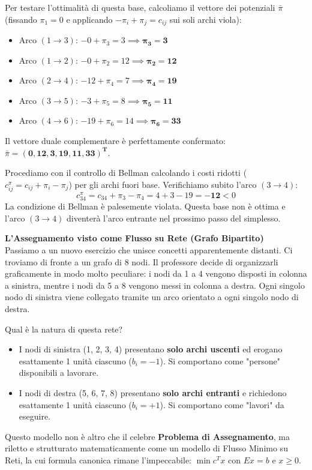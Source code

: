 \documentclass[12pt, a4paper]{article}
\newcommand{\separatore}{\noindent{\color{titlecolor!50}\rule{\textwidth}{0.6pt}}}
\begin{document}
	Per testare l'ottimalità di questa base, calcoliamo il vettore dei potenziali $\bar{\pi}$ (fissando $\pi_1 = 0$ e applicando $-\pi_i + \pi_j = c_{ij}$ sui soli archi viola):
	\begin{itemize}[label=$\circ$, itemsep=2pt, leftmargin=1.5cm]
		\item Arco $(1\to3)$: $-0 + \pi_3 = 3 \implies \mathbf{\pi_3 = 3}$
		\item Arco $(1\to2)$: $-0 + \pi_2 = 12 \implies \mathbf{\pi_2 = 12}$
		\item Arco $(2\to4)$: $-12 + \pi_4 = 7 \implies \mathbf{\pi_4 = 19}$
		\item Arco $(3\to5)$: $-3 + \pi_5 = 8 \implies \mathbf{\pi_5 = 11}$
		\item Arco $(4\to6)$: $-19 + \pi_6 = 14 \implies \mathbf{\pi_6 = 33}$
	\end{itemize}
	Il vettore duale complementare è perfettamente confermato: $\bar{\pi} = \mathbf{(0, 12, 3, 19, 11, 33)^T}$.
	
	Procediamo con il controllo di Bellman calcolando i costi ridotti ($c_{ij}^\pi = c_{ij} + \pi_i - \pi_j$) per gli archi fuori base. Verifichiamo subito l'arco $(3\to4)$:
	\[ c_{34}^\pi = c_{34} + \pi_3 - \pi_4 = 4 + 3 - 19 = \mathbf{-12} < 0 \]
	La condizione di Bellman è palesemente violata. Questa base non è ottima e l'arco $(3\to4)$ diventerà l'arco entrante nel prossimo passo del simplesso.
	
	\vspace{0.6cm}
	\separatore
	\vspace{0.4cm}
	
	\textbf{L'Assegnamento visto come Flusso su Rete (Grafo Bipartito)}\\
	Passiamo a un nuovo esercizio che unisce concetti apparentemente distanti. Ci troviamo di fronte a un grafo di 8 nodi. Il professore decide di organizzarli graficamente in modo molto peculiare: i nodi da 1 a 4 vengono disposti in colonna a sinistra, mentre i nodi da 5 a 8 vengono messi in colonna a destra. 
	Ogni singolo nodo di sinistra viene collegato tramite un arco orientato a ogni singolo nodo di destra.
	
	Qual è la natura di questa rete?
	\begin{itemize}[label=\textcolor{titlecolor}{\Large\textbullet}, itemsep=2pt, leftmargin=1.5cm]
		\item I nodi di sinistra (1, 2, 3, 4) presentano \textbf{solo archi uscenti} ed erogano esattamente 1 unità ciascuno ($b_i = -1$). Si comportano come "persone" disponibili a lavorare.
		\item I nodi di destra (5, 6, 7, 8) presentano \textbf{solo archi entranti} e richiedono esattamente 1 unità ciascuno ($b_i = +1$). Si comportano come "lavori" da eseguire.
	\end{itemize}
	Questo modello non è altro che il celebre \textbf{Problema di Assegnamento}, ma riletto e strutturato matematicamente come un modello di Flusso Minimo su Reti, la cui formula canonica rimane l'impeccabile: $\min c^T x$ con $Ex = b$ e $x \ge 0$.
	
\end{document}
